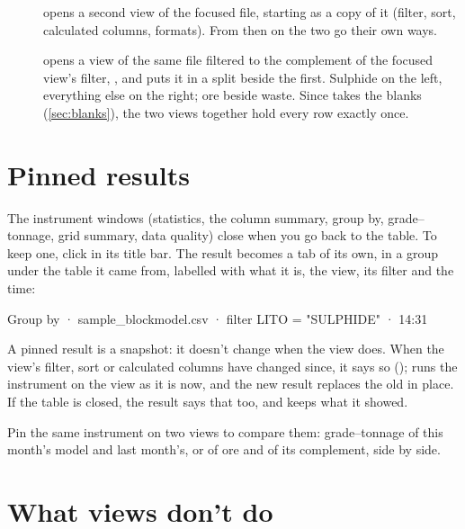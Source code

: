 \begin{description}
\item[] opens a second view of the focused file, starting as a copy of
it (filter, sort, calculated columns, formats). From then on the two go their own ways.
\item[] opens a view of the same file filtered to
the complement of the focused view's filter, , and puts it in a split beside the first.
Sulphide on the left, everything else on the right; ore beside waste. Since  takes the blanks
(\cref{sec:blanks}), the two views together hold every row exactly once.
\end{description}

\section{Pinned results}\label{sec:pins}

The instrument windows (statistics, the column summary, group by, grade–tonnage, grid summary, data
quality) close when you go back to the table. To keep one, click  in its title bar. The result
becomes a tab of its own, in a group under the table it came from, labelled with what it is, the view,
its filter and the time:

\begin{codeblock}
Group by · sample_blockmodel.csv · filter LITO = "SULPHIDE" · 14:31
\end{codeblock}

A pinned result is a snapshot: it doesn't change when the view does. When the view's filter, sort or
calculated columns have changed since, it says so (); 
runs the instrument on the view as it is now, and the new result replaces the old in place. If the table
is closed, the result says that too, and keeps what it showed.


\begin{tip}
Pin the same instrument on two views to compare them: grade–tonnage of this month's model and last
month's, or of ore and of its complement, side by side.
\end{tip}

\section{What views don't do}

